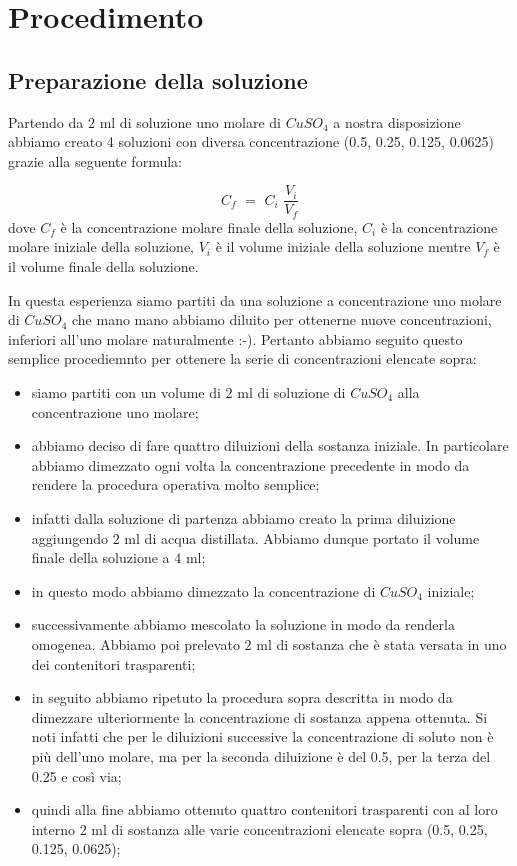 
\section{Procedimento}

\subsection{Preparazione della soluzione}

Partendo da $2\,\,\si{\milli\litre}$ di soluzione uno molare di $CuSO_4$ a nostra disposizione abbiamo creato 4 soluzioni con diversa concentrazione (0.5, 0.25, 0.125, 0.0625) grazie alla seguente formula:

\begin{equation}
	C_f \,\, = \,\, C_i \,\, \frac{V_i}{V_f}
	\label{eq:proporzione}
\end{equation}
%
dove $C_f$ è la concentrazione molare finale della soluzione, $C_i$ è la concentrazione molare iniziale della soluzione, $V_i$ è il volume iniziale della soluzione mentre $V_f$ è il volume finale della soluzione.

In questa esperienza siamo partiti da una soluzione a concentrazione uno molare di $CuSO_4$ che mano mano abbiamo diluito per ottenerne nuove concentrazioni, inferiori all'uno molare naturalmente :-).
Pertanto abbiamo seguito questo semplice procediemnto per ottenere la serie di concentrazioni elencate sopra:

\begin{itemize}
	\item{siamo partiti con un volume di $2\,\,\si{\milli\litre}$ di soluzione di $CuSO_4$ alla concentrazione uno molare;}
	\item{abbiamo deciso di fare quattro diluizioni della sostanza iniziale. In particolare abbiamo dimezzato ogni volta la concentrazione precedente in modo da rendere la procedura operativa molto semplice;}
	\item{infatti dalla soluzione di partenza abbiamo creato la prima diluizione aggiungendo $2\,\,\si{\milli\litre}$ di acqua distillata. Abbiamo dunque portato il volume finale della soluzione a $4\,\,\si{\milli\litre}$;}
	\item{in questo modo abbiamo dimezzato la concentrazione di $CuSO_4$ iniziale;}
	\item{successivamente abbiamo mescolato la soluzione in modo da renderla omogenea. Abbiamo poi prelevato $2\,\,\si{\milli\litre}$ di sostanza che è stata versata in uno dei contenitori trasparenti;}
	\item{in seguito abbiamo ripetuto la procedura sopra descritta in modo da dimezzare ulteriormente la concentrazione di sostanza appena ottenuta. Si noti infatti che per le diluizioni successive la concentrazione di soluto non è più dell'uno molare, ma per la seconda diluizione è del 0.5, per la terza del 0.25 e così via;}
	\item{quindi alla fine abbiamo ottenuto quattro contenitori trasparenti con al loro interno $2\,\,\si{\milli\litre}$ di sostanza alle varie concentrazioni elencate sopra (0.5, 0.25, 0.125, 0.0625);}
\end{itemize}

